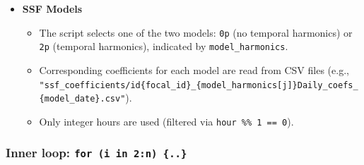 \documentclass[
  letterpaper,
  DIV=11,
  numbers=noendperiod]{scrartcl}
\providecommand{\tightlist}{%
  \setlength{\itemsep}{0pt}\setlength{\parskip}{0pt}}
\begin{document}
\begin{itemize}
\item
  \textbf{SSF Models}

  \begin{itemize}
  \tightlist
  \item
    The script selects one of the two models: \texttt{0p} (no temporal
    harmonics) or \texttt{2p} (temporal harmonics), indicated by
    \texttt{model\_harmonics}.
  \item
    Corresponding coefficients for each model are read from CSV files
    (e.g.,
    \texttt{"ssf\_coefficients/id\{focal\_id\}\_\{model\_harmonics{[}j{]}\}Daily\_coefs\_\{model\_date\}.csv"}).
  \item
    Only integer hours are used (filtered via
    \texttt{hour\ \%\%\ 1\ ==\ 0}).\\
  \end{itemize}
\end{itemize}

\subsubsection{\texorpdfstring{Inner loop:
\texttt{for\ (i\ in\ 2:n)\ \{..\}}}{Inner loop: for (i in 2:n) \{..\}}}\label{inner-loop-for-i-in-2n-..}
\end{document}
